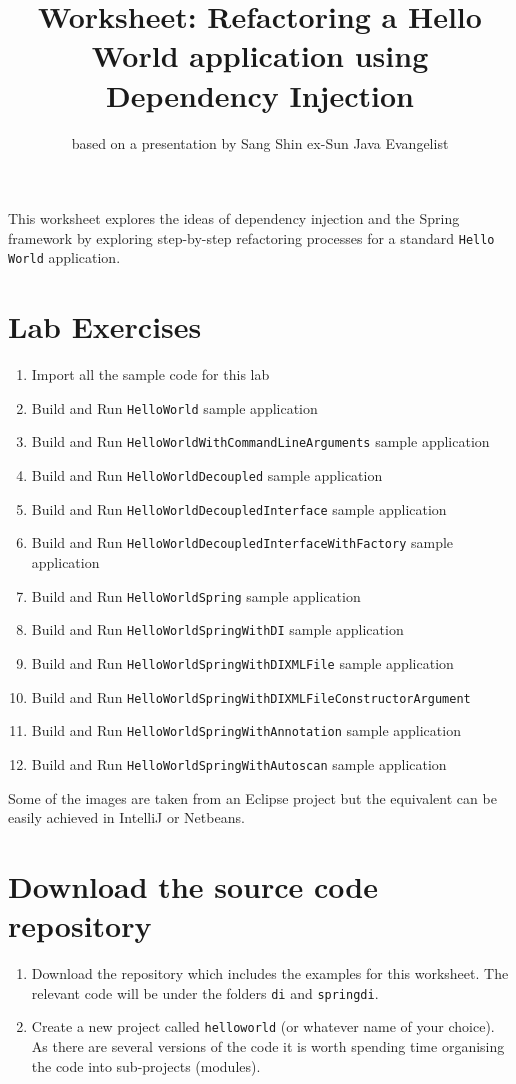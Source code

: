 \documentclass[11pt]{article}
\title{Worksheet: Refactoring a Hello World application using Dependency Injection}
\author{based on a presentation by Sang Shin ex-Sun Java Evangelist}
\date{}
\begin{document}
\maketitle

This worksheet explores the ideas of dependency injection and the Spring framework by exploring
step-by-step refactoring processes for a standard \texttt{Hello World} application.

\section*{Lab Exercises}

\begin{enumerate}
\item Import all the sample code for this lab
\item Build and Run \verb!HelloWorld! sample application
\item Build and Run \verb!HelloWorldWithCommandLineArguments! sample application
\item Build and Run \verb!HelloWorldDecoupled! sample application
\item Build and Run \verb!HelloWorldDecoupledInterface! sample application 
\item Build and Run \verb!HelloWorldDecoupledInterfaceWithFactory! sample application 
\item Build and Run \verb!HelloWorldSpring! sample application
\item Build and Run \verb!HelloWorldSpringWithDI! sample application
\item Build and Run \verb!HelloWorldSpringWithDIXMLFile! sample application
\item Build and Run \verb!HelloWorldSpringWithDIXMLFileConstructorArgument!
\item Build and Run \verb!HelloWorldSpringWithAnnotation! sample application
\item Build and Run \verb!HelloWorldSpringWithAutoscan! sample application
\end{enumerate}

Some of the images are taken from an Eclipse project but the equivalent can be easily 
achieved in IntelliJ or Netbeans.

\section{Download the source code repository}

\begin{enumerate}
\item 
Download the repository which includes the examples for this worksheet.
The relevant code will be under the folders \verb!di! and \verb!springdi!.
\item
Create a new project called \verb!helloworld! (or
whatever name of your choice). As there are several versions of the code 
it is worth spending time organising the code into sub-projects (modules).
\end{enumerate}
\end{document}
